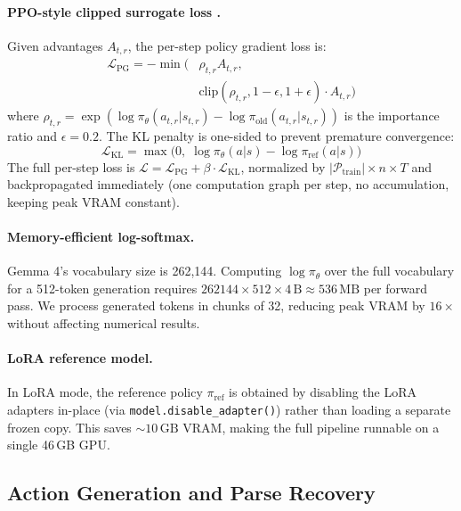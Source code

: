 \documentclass[letterpaper]{article} %
\begin{document}
\paragraph{PPO-style clipped surrogate loss \citep{schulman2017proximal}.} Given advantages $A_{t,r}$, the per-step policy gradient loss is:
\begin{equation}
\label{eq:pgloss}
\begin{split}
\mathcal{L}_{\mathrm{PG}} = -\min\!\bigl(&\rho_{t,r} A_{t,r},\\
  &\mathrm{clip}(\rho_{t,r}, 1{-}\epsilon, 1{+}\epsilon)\cdot A_{t,r}\bigr)
\end{split}
\end{equation}
where $\rho_{t,r} = \exp(\log\pi_\theta(a_{t,r}|s_{t,r}) - \log\pi_{\mathrm{old}}(a_{t,r}|s_{t,r}))$ is the importance ratio and $\epsilon = 0.2$. The KL penalty is one-sided to prevent premature convergence:
\begin{equation}
\label{eq:kl}
\mathcal{L}_{\mathrm{KL}} = \max\!\bigl(0,\; \log\pi_\theta(a|s) - \log\pi_{\mathrm{ref}}(a|s)\bigr)
\end{equation}
The full per-step loss is $\mathcal{L} = \mathcal{L}_{\mathrm{PG}} + \beta \cdot \mathcal{L}_{\mathrm{KL}}$, normalized by $|\mathcal{P}_{\mathrm{train}}| \times n \times T$ and backpropagated immediately (one computation graph per step, no accumulation, keeping peak VRAM constant).
\paragraph{Memory-efficient log-softmax.} Gemma 4's vocabulary size is 262,144. Computing $\log\pi_\theta$ over the full vocabulary for a 512-token generation requires $262144 \times 512 \times 4\,\text{B} \approx 536\,\text{MB}$ per forward pass. We process generated tokens in chunks of 32, reducing peak VRAM by $16\times$ without affecting numerical results.
\paragraph{LoRA reference model.} In LoRA mode, the reference policy $\pi_{\mathrm{ref}}$ is obtained by disabling the LoRA adapters in-place (via \texttt{model.disable\_adapter()}) rather than loading a separate frozen copy. This saves ${\sim}10\,\text{GB}$ VRAM, making the full pipeline runnable on a single 46\,GB GPU.
\subsection{Action Generation and Parse Recovery}
\label{sec:parse}
\end{document}
